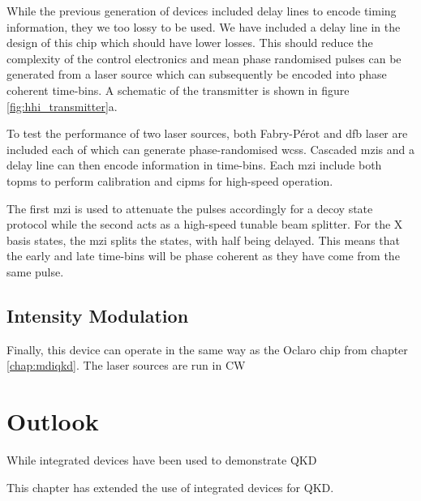 While the previous generation of devices included delay lines to encode timing information, they we too lossy to be used. We have included a delay line in the design of this chip which should have lower losses. This should reduce the complexity of the control electronics and mean phase randomised pulses can be generated from a laser source which can subsequently be encoded into phase coherent time-bins. A schematic of the transmitter is shown in figure \ref{fig:hhi_transmitter}a.

To test the performance of two laser sources, both Fabry-P\'{e}rot and \ac{dfb} laser are included each of which can generate phase-randomised \acp{wcs}. Cascaded \acp{mzi} and a delay line can then encode information in time-bins. Each \ac{mzi} include both \acp{topm} to perform calibration and \acp{cipm} for high-speed operation. 

The first \ac{mzi} is used to attenuate the pulses accordingly for a decoy state protocol while the second acts as a high-speed tunable beam splitter. For the X basis states, the \ac{mzi} splits the states, with half being delayed. This means that the early and late time-bins will be phase coherent as they have come from the same pulse. 

\subsection{Intensity Modulation}

Finally, this device can operate in the same way as the Oclaro chip from chapter \ref{chap:mdiqkd}. The laser sources are run in \ac{CW} 

\section{Outlook}

While integrated devices have been used to demonstrate \ac{QKD} \cite{Sibson2017InP, Sibson2017Si, semenenko2019mdi, zhang2019integrated, ma2016silicon, paraiso2019}

This chapter has extended the use of integrated devices for \acl{QKD}.


